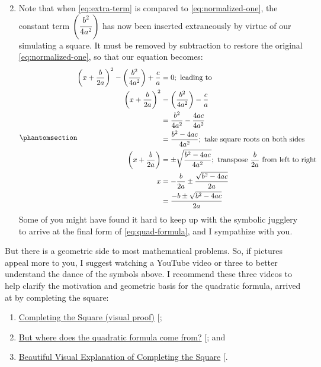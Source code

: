 \documentclass[
  a4paper,
]{article}
\begin{document}
\begin{enumerate}
\begin{equation}
{  }\end{equation}
\item
  Note that when \cref{eq:extra-term} is compared to
  \cref{eq:normalized-one}, the constant term
  \(\left(\dfrac{b^2}{4a^2}\right)\) has now been inserted extraneously
  by virtue of our simulating a square. It must be removed by
  subtraction to restore the original \cref{eq:normalized-one}, so that
  our equation becomes:
  \begin{equation}\phantomsection\label{eq:quad-formula}{
  \begin{aligned}
  \left(x + \frac{b}{2a}\right)^2 - \left(\frac{b^2}{4a^2}\right) + \frac{c}{a} &= 0; \text{ leading to}\\
  \left(x + \frac{b}{2a}\right)^2 &= \left(\frac{b^2}{4a^2}\right) - \frac{c}{a}\\
  &= \frac{b^2}{4a^2} - \frac{4ac}{4a^2}\\
  &= \frac{b^2 - 4ac}{4a^2}; \text{ take square roots on both sides}\\
  \left(x + \frac{b}{2a}\right) &= \pm\sqrt{\frac{b^2 - 4ac}{4a^2}}; \text{ transpose $\frac{b}{2a}$ from left to right}\\
  x &= -\frac{b}{2a} \pm \frac{\sqrt{b^2 - 4ac}}{2a}\\
  &=\frac{-{b} \pm \sqrt{b^2 - 4ac}}{2a}
  \end{aligned}
  }\end{equation} Some of you might have found it hard to keep up with
  the symbolic jugglery to arrive at the final form of
  \cref{eq:quad-formula}, and I sympathize with you.
\end{enumerate}

But there is a geometric side to most mathematical problems. So, if
pictures appeal more to you, I suggest watching a YouTube video or three
to better understand the dance of the symbols above. I recommend these
three videos to help clarify the motivation and geometric basis for the
quadratic formula, arrived at by completing the square:

\begin{enumerate}
\def\labelenumi{\alph{enumi}.}
\item
  \href{https://www.youtube.com/watch?v=T0HyWIFbsHQ}{Completing the
  Square (visual proof)} {[}\citeproc{ref-mvp-2022}{2}{]};
\item
  \href{https://www.youtube.com/watch?v=7Q4h1YTYgnE}{But where does the
  quadratic formula come from?}
  {[}\citeproc{ref-foggy-maths-2023}{3}{]}; and
\item
  \href{https://www.youtube.com/watch?v=McDdEw_Fb5E}{Beautiful Visual
  Explanation of Completing the Square}
  {[}\citeproc{ref-woo-2016}{4}{]}.
\end{enumerate}
\end{document}
